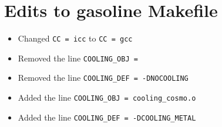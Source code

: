 \documentclass[11pt,letterpaper]{article}
\begin{document}
\section*{Edits to gasoline Makefile}
\begin{itemize}
\item Changed \verb!CC = icc! to \verb!CC = gcc!
\item Removed the line \verb!COOLING_OBJ = !
\item Removed the line \verb!COOLING_DEF = -DNOCOOLING!
\item Added the line \verb!COOLING_OBJ = cooling_cosmo.o!
\item Added the line \verb!COOLING_DEF = -DCOOLING_METAL!
\end{itemize}
\end{document}
